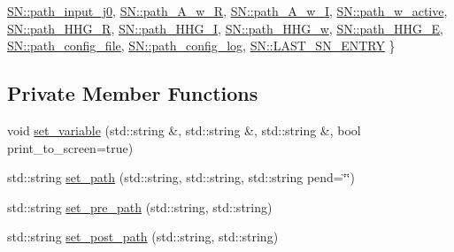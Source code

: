 \begin{DoxyCompactItemize}
\hyperlink{class_config___settings_af7668729f6d56b25d126b0a9ce06474fa07356c2c6e499a7440eda391e17e3ddf}{S\+N\+::path\+\_\+input\+\_\+j0}, 
\hyperlink{class_config___settings_af7668729f6d56b25d126b0a9ce06474faa0190b405b0dca9aaf90b9eab31cddc9}{S\+N\+::path\+\_\+\+A\+\_\+w\+\_\+R}, 
\hyperlink{class_config___settings_af7668729f6d56b25d126b0a9ce06474fa723f16bd44b5c519243c37ac165df732}{S\+N\+::path\+\_\+\+A\+\_\+w\+\_\+I}, 
\newline
\hyperlink{class_config___settings_af7668729f6d56b25d126b0a9ce06474fa64b9d0f9f55fb6ad349ff704f3d710bb}{S\+N\+::path\+\_\+w\+\_\+active}, 
\hyperlink{class_config___settings_af7668729f6d56b25d126b0a9ce06474fa55ae11324ef03ba27814d1175e8d12f0}{S\+N\+::path\+\_\+\+H\+H\+G\+\_\+R}, 
\hyperlink{class_config___settings_af7668729f6d56b25d126b0a9ce06474fa656218c9143eb88ee385dfe7ea618d6c}{S\+N\+::path\+\_\+\+H\+H\+G\+\_\+I}, 
\hyperlink{class_config___settings_af7668729f6d56b25d126b0a9ce06474faaf71223a57febdc55d591cfec7acdff5}{S\+N\+::path\+\_\+\+H\+H\+G\+\_\+w}, 
\newline
\hyperlink{class_config___settings_af7668729f6d56b25d126b0a9ce06474fa3e723a56c4eccaf90be08c4f0b8a4dc8}{S\+N\+::path\+\_\+\+H\+H\+G\+\_\+E}, 
\hyperlink{class_config___settings_af7668729f6d56b25d126b0a9ce06474faea30eaeccb42cf92fa55ea6f3518b2e6}{S\+N\+::path\+\_\+config\+\_\+file}, 
\hyperlink{class_config___settings_af7668729f6d56b25d126b0a9ce06474fa9bd8b67c10b9b673ee424a957d1a953a}{S\+N\+::path\+\_\+config\+\_\+log}, 
\hyperlink{class_config___settings_af7668729f6d56b25d126b0a9ce06474fa3c1a917b21de40f1eec670b1425c2e45}{S\+N\+::\+L\+A\+S\+T\+\_\+\+S\+N\+\_\+\+E\+N\+T\+RY}
 \}
\end{DoxyCompactItemize}
\subsection*{Private Member Functions}
\begin{DoxyCompactItemize}
\item 
void \hyperlink{class_config___settings_aac05d4283c44d73df79a31c4d9daeab0}{set\+\_\+variable} (std\+::string \&, std\+::string \&, std\+::string \&, bool print\+\_\+to\+\_\+screen=true)
\item 
std\+::string \hyperlink{class_config___settings_a4d2c6e8c21b58d66491e90a0e04713dd}{set\+\_\+path} (std\+::string, std\+::string, std\+::string pend=\char`\"{}\char`\"{})
\item 
std\+::string \hyperlink{class_config___settings_aee649ed611ec780e1c98d81e5107f4b5}{set\+\_\+pre\+\_\+path} (std\+::string, std\+::string)
\item 
std\+::string \hyperlink{class_config___settings_a194d4bf62b0395b7f743c3101de5983b}{set\+\_\+post\+\_\+path} (std\+::string, std\+::string)
\end{DoxyCompactItemize}
